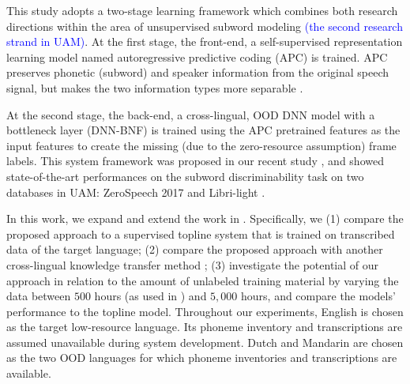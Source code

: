 \documentclass[transmag]{IEEEtran}
\begin{document}
This study adopts a two-stage learning framework which combines both research directions within the area of unsupervised subword modeling \textcolor{blue}{(the second research strand in UAM)}. 
At the first stage, the front-end, a self-supervised representation learning model named autoregressive predictive coding (APC)   \cite{Chung2019}  is trained. APC preserves phonetic (subword) and speaker information from the original speech signal, but makes the two information types more separable \cite{Chung2019}. %

At the second stage, the back-end, a cross-lingual, OOD DNN model with a bottleneck layer (DNN-BNF) is trained using the APC pretrained features as the input features to create the missing (due to the zero-resource assumption) frame labels.
This system framework was proposed in our recent study \cite{feng2020unsupervised}, 
and showed state-of-the-art performances on the subword discriminability task on two databases in UAM: ZeroSpeech 2017 \cite{dunbar2017zero} and Libri-light \cite{kahn2019librilight}. 

In this work, we expand and extend the work in \cite{feng2020unsupervised}. Specifically, we (1) compare the proposed approach to a supervised topline system that is trained on transcribed data of the target language; (2) compare the proposed approach with another cross-lingual knowledge transfer method  \cite{shibata2017composite};
(3) investigate the potential of our approach in relation to the amount of unlabeled training material by varying the data between $500$ hours  (as used in \cite{feng2020unsupervised}) and $5,000$ hours, and compare the models' performance to the topline model. Throughout our experiments, English is chosen as the target low-resource language. Its phoneme inventory and transcriptions are assumed unavailable during system development. Dutch and Mandarin are chosen as the two OOD languages for which phoneme inventories and transcriptions are available.
\end{document}
